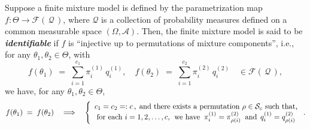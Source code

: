 \begin{definition}
\mbox{}\vskip 0.05cm
\noindent
Suppose a finite mixture model is defined by the parametrization map
$f : \Theta \longrightarrow \mathcal{F}\!\left(\,\mathcal{Q}\,\right)$,
where $\mathcal{Q}$ is a collection of probability measures
defined on a common measurable space $\left(\Omega,\mathcal{A}\right)$.
Then, the finite mixture model is said to be \textbf{\emph{identifiable}} if
$f$ is ``injective up to permutations of mixture components'',
i.e., for any $\theta_{1}, \theta_{2} \in \Theta$, with
\begin{equation*}
f(\theta_{1}) \;=\; \overset{c_{1}}{\underset{i=1}{\sum}}\pi^{(1)}_{i}\,q^{(1)}_{i},
\quad
f(\theta_{2}) \;=\; \overset{c_{2}}{\underset{i=1}{\sum}}\pi^{(2)}_{i}\,q^{(2)}_{i}
\quad
\in \mathcal{F}\!\left(\,\mathcal{Q}\,\right),
\end{equation*}
we have, for any $\theta_{1}, \theta_{2} \in \Theta$,
\begin{equation*}
f(\theta_{1}) \; = \; f(\theta_{2})
\quad\Longrightarrow\quad
\left\{\begin{array}{c}
	c_{1} = c_{2} =: c\,, \;\textnormal{and there exists a permutation $\rho \in \mathcal{S}_{c}$ such that,} \\
	\textnormal{for each $i = 1,2,\ldots,c$, \;we have}\;\;
	\pi^{(1)}_{i} = \pi^{(2)}_{\rho(i)}
	\;\;\textnormal{and}\;\,
	q^{(1)}_{i} = q^{(2)}_{\rho(i)}
\end{array}\right..
\end{equation*}
\end{definition}

